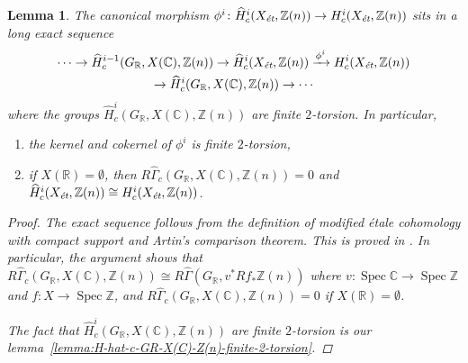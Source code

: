 \documentclass[draft,leqno,12pt]{article}
\theoremstyle{plain}
\newtheorem{lemma}[theorem]{\indent\sc Lemma}
\theoremstyle{definition}
\DeclareMathOperator{\Spec}{Spec}
\newcommand{\ZZ}{\mathbb{Z}}
\newcommand{\RR}{\mathbb{R}}
\newcommand{\CC}{\mathbb{C}}
\newcommand{\et}{\text{\it \'{e}t}}
\begin{document}
\begin{lemma}
  \label{lemma:morphism-hat-Hc(Xet,Z(n))->Hc(Xet,Z(n))}
  The canonical morphism
  $\phi^i\colon \widehat{H}^i_c (X_\et, \ZZ (n)) \to H^i_c (X_\et, \ZZ (n))$
  sits in a long exact sequence
  \begin{multline*}
    \cdots \to \widehat{H}^{i-1}_c (G_\RR, X (\CC), \ZZ (n)) \to
    \widehat{H}_c^i (X_\et, \ZZ(n)) \xrightarrow{\phi^i}
    H_c^i (X_\et, \ZZ(n)) \\
    \to \widehat{H}^i_c (G_\RR, X (\CC), \ZZ (n)) \to \cdots
  \end{multline*}
  where the groups $\widehat{H}^i_c (G_\RR, X (\CC), \ZZ
  (n))$ are finite $2$-torsion. In particular,
  \begin{enumerate}
  \item[$1)$] the kernel and cokernel of $\phi^i$ is finite $2$-torsion,

  \item[$2)$] if $X (\RR) = \emptyset$, then
    $R\widehat{\Gamma}_c (G_\RR, X (\CC), \ZZ (n)) = 0$ and
    $\widehat{H}^i_c (X_\et, \ZZ (n)) \cong H^i_c (X_\et, \ZZ (n))$.
  \end{enumerate}

  \begin{proof}
    The exact sequence follows from the definition of modified \'{e}tale cohomology
    with compact support and Artin's comparison theorem. This is proved in
    \cite[Lemma~6.14]{Flach-Morin-2018}. In particular, the argument shows that
    $R\widehat{\Gamma}_c (G_\RR, X (\CC), \ZZ (n)) \cong
    R\widehat{\Gamma} (G_\RR, v^* Rf_* \ZZ(n))$ where
    $v\colon \Spec \CC \to \Spec \ZZ$ and $f\colon X\to \Spec \ZZ$,
    and $R\widehat{\Gamma}_c (G_\RR, X (\CC), \ZZ (n)) = 0$ if
    $X (\RR) = \emptyset$.

    The fact that $\widehat{H}^i_c (G_\RR, X (\CC), \ZZ (n))$ are finite
    $2$-torsion is our lemma~\ref{lemma:H-hat-c-GR-X(C)-Z(n)-finite-2-torsion}.
  \end{proof}
\end{lemma}
\end{document}
